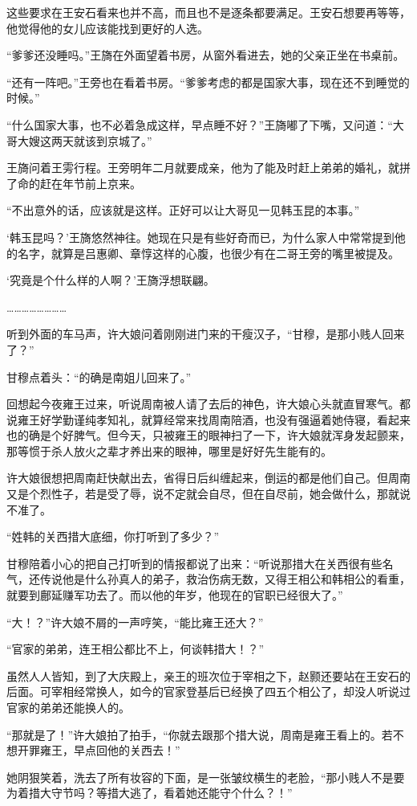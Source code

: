 这些要求在王安石看来也并不高，而且也不是逐条都要满足。王安石想要再等等，他觉得他的女儿应该能找到更好的人选。

“爹爹还没睡吗。”王旖在外面望着书房，从窗外看进去，她的父亲正坐在书桌前。

“还有一阵吧。”王旁也在看着书房。“爹爹考虑的都是国家大事，现在还不到睡觉的时候。”

“什么国家大事，也不必着急成这样，早点睡不好？”王旖嘟了下嘴，又问道：“大哥大嫂这两天就该到京城了。”

王旖问着王雱行程。王旁明年二月就要成亲，他为了能及时赶上弟弟的婚礼，就拼了命的赶在年节前上京来。

“不出意外的话，应该就是这样。正好可以让大哥见一见韩玉昆的本事。”

‘韩玉昆吗？’王旖悠然神往。她现在只是有些好奇而已，为什么家人中常常提到他的名字，就算是吕惠卿、章惇这样的心腹，也很少有在二哥王旁的嘴里被提及。

‘究竟是个什么样的人啊？’王旖浮想联翩。

……………………

听到外面的车马声，许大娘问着刚刚进门来的干瘦汉子，“甘穆，是那小贱人回来了？”

甘穆点着头：“的确是南姐儿回来了。”

回想起今夜雍王过来，听说周南被人请了去后的神色，许大娘心头就直冒寒气。都说雍王好学勤谨纯孝知礼，就算经常来找周南陪酒，也没有强逼着她侍寝，看起来也的确是个好脾气。但今天，只被雍王的眼神扫了一下，许大娘就浑身发起颤来，那等惯于杀人放火之辈才养出来的眼神，哪里是好好先生能有的。

许大娘很想把周南赶快献出去，省得日后纠缠起来，倒运的都是他们自己。但周南又是个烈性子，若是受了辱，说不定就会自尽，但在自尽前，她会做什么，那就说不准了。

“姓韩的关西措大底细，你打听到了多少？”

甘穆陪着小心的把自己打听到的情报都说了出来：“听说那措大在关西很有些名气，还传说他是什么孙真人的弟子，救治伤病无数，又得王相公和韩相公的看重，就要到鄜延赚军功去了。而以他的年岁，他现在的官职已经很大了。”

“大！？”许大娘不屑的一声哼笑，“能比雍王还大？”

“官家的弟弟，连王相公都比不上，何谈韩措大！？”

虽然人人皆知，到了大庆殿上，亲王的班次位于宰相之下，赵颢还要站在王安石的后面。可宰相经常换人，如今的官家登基后已经换了四五个相公了，却没人听说过官家的弟弟还能换人的。

“那就是了！”许大娘拍了拍手，“你就去跟那个措大说，周南是雍王看上的。若不想开罪雍王，早点回他的关西去！”

她阴狠笑着，洗去了所有妆容的下面，是一张皱纹横生的老脸，“那小贱人不是要为着措大守节吗？等措大逃了，看着她还能守个什么？！”


